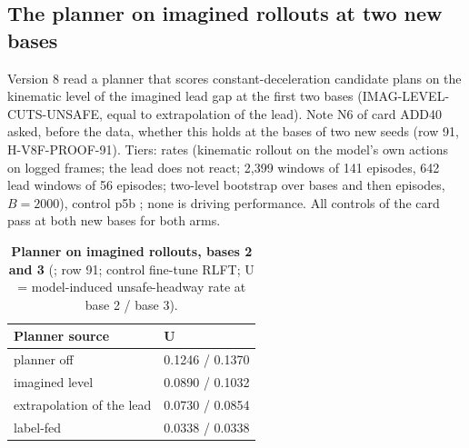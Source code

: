 \subsection{The planner on imagined rollouts at two new bases}\label{sec:replan}
Version 8 read a planner that scores constant-deceleration candidate plans on the kinematic level of the imagined lead gap at the first two bases (IMAG-LEVEL-CUTS-UNSAFE, equal to extrapolation of the lead). Note N6 of card ADD40 asked, before the data, whether this holds at the bases of two new seeds (row 91, H-V8F-PROOF-91). Tiers: rates  (kinematic rollout on the model's own actions on logged frames; the lead does not react; 2,399 windows of 141 episodes, 642 lead windows of 56 episodes; two-level bootstrap over bases and then episodes, $B=2000$), control p5b ; none is driving performance. All controls of the card pass at both new bases for both arms.

\begin{table}[!t]
\centering
\caption{\textbf{Planner on imagined rollouts, bases 2 and 3} (; row 91; control fine-tune RLFT; U = model-induced unsafe-headway rate at base 2 / base 3).}
\label{tab:replan}
\scriptsize
\begin{tabularx}{\columnwidth}{@{}>{\raggedright\arraybackslash}Xl@{}}
\toprule
Planner source & U \\
\midrule
planner off & 0.1246 / 0.1370 \\
imagined level & 0.0890 / 0.1032 \\
extrapolation of the lead & 0.0730 / 0.0854 \\
label-fed & 0.0338 / 0.0338 \\
\bottomrule
\end{tabularx}
\end{table}

